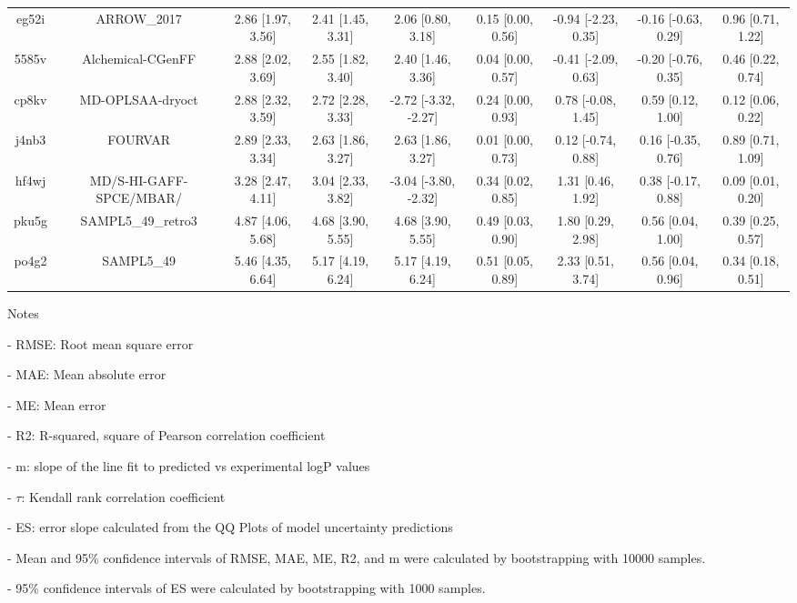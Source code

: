 \documentclass{article}
\begin{document}
\begin{center}
\begin{longtable}{|ccccccccc|}
 eg52i &                                        ARROW\_2017 &  2.86 [1.97, 3.56] &  2.41 [1.45, 3.31] &     2.06 [0.80, 3.18] &  0.15 [0.00, 0.56] &  -0.94 [-2.23, 0.35] &  -0.16 [-0.63, 0.29] &     0.96 [0.71, 1.22] \\
 5585v &                                  Alchemical-CGenFF &  2.88 [2.02, 3.69] &  2.55 [1.82, 3.40] &     2.40 [1.46, 3.36] &  0.04 [0.00, 0.57] &  -0.41 [-2.09, 0.63] &  -0.20 [-0.76, 0.35] &     0.46 [0.22, 0.74] \\
 cp8kv &                                   MD-OPLSAA-dryoct &  2.88 [2.32, 3.59] &  2.72 [2.28, 3.33] &  -2.72 [-3.32, -2.27] &  0.24 [0.00, 0.93] &   0.78 [-0.08, 1.45] &    0.59 [0.12, 1.00] &     0.12 [0.06, 0.22] \\
 j4nb3 &                                            FOURVAR &  2.89 [2.33, 3.34] &  2.63 [1.86, 3.27] &     2.63 [1.86, 3.27] &  0.01 [0.00, 0.73] &   0.12 [-0.74, 0.88] &   0.16 [-0.35, 0.76] &     0.89 [0.71, 1.09] \\
 hf4wj &                            MD/S-HI-GAFF-SPCE/MBAR/ &  3.28 [2.47, 4.11] &  3.04 [2.33, 3.82] &  -3.04 [-3.80, -2.32] &  0.34 [0.02, 0.85] &    1.31 [0.46, 1.92] &   0.38 [-0.17, 0.88] &     0.09 [0.01, 0.20] \\
 pku5g &                                 SAMPL5\_49\_retro3 &  4.87 [4.06, 5.68] &  4.68 [3.90, 5.55] &     4.68 [3.90, 5.55] &  0.49 [0.03, 0.90] &    1.80 [0.29, 2.98] &    0.56 [0.04, 1.00] &     0.39 [0.25, 0.57] \\
 po4g2 &                                         SAMPL5\_49 &  5.46 [4.35, 6.64] &  5.17 [4.19, 6.24] &     5.17 [4.19, 6.24] &  0.51 [0.05, 0.89] &    2.33 [0.51, 3.74] &    0.56 [0.04, 0.96] &     0.34 [0.18, 0.51] \\
\end{longtable}
\end{center}

Notes

- RMSE: Root mean square error

- MAE: Mean absolute error

- ME: Mean error

- R2: R-squared, square of Pearson correlation coefficient

- m: slope of the line fit to predicted vs experimental logP values

- $\tau$:  Kendall rank correlation coefficient

- ES: error slope calculated from the QQ Plots of model uncertainty predictions

- Mean and 95\% confidence intervals of RMSE, MAE, ME, R2, and m were calculated by bootstrapping with 10000 samples.

- 95\% confidence intervals of ES were calculated by bootstrapping with 1000 samples.\end{document}
\end{document}
